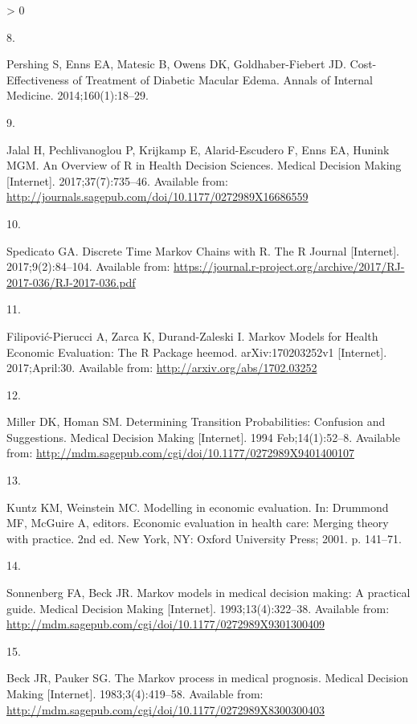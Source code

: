 \documentclass[
]{article}
\newlength{\cslhangindent}
\newlength{\csllabelwidth}
\newenvironment{CSLReferences}[2] %
 {%
  \setlength{\parindent}{0pt}
  \ifodd #1 \everypar{\setlength{\hangindent}{\cslhangindent}}\ignorespaces\fi
  \ifnum #2 > 0
  \setlength{\parskip}{#2\baselineskip}
  \fi
 }%
 {}
\newcommand{\CSLLeftMargin}[1]{\parbox[t]{\csllabelwidth}{#1}}
\newcommand{\CSLRightInline}[1]{\parbox[t]{\linewidth - \csllabelwidth}{#1}\break}
\begin{document}
\begin{CSLReferences}{0}{0}
\leavevmode\hypertarget{ref-Pershing2014}{}%
\CSLLeftMargin{8. }
\CSLRightInline{Pershing S, Enns EA, Matesic B, Owens DK, Goldhaber-Fiebert JD. {Cost-Effectiveness of Treatment of Diabetic Macular Edema}. Annals of Internal Medicine. 2014;160(1):18--29. }

\leavevmode\hypertarget{ref-Jalal2017b}{}%
\CSLLeftMargin{9. }
\CSLRightInline{Jalal H, Pechlivanoglou P, Krijkamp E, Alarid-Escudero F, Enns EA, Hunink MGM. {An Overview of R in Health Decision Sciences}. Medical Decision Making {[}Internet{]}. 2017;37(7):735--46. Available from: \url{http://journals.sagepub.com/doi/10.1177/0272989X16686559}}

\leavevmode\hypertarget{ref-Spedicato2017}{}%
\CSLLeftMargin{10. }
\CSLRightInline{Spedicato GA. {Discrete Time Markov Chains with R}. The R Journal {[}Internet{]}. 2017;9(2):84--104. Available from: \url{https://journal.r-project.org/archive/2017/RJ-2017-036/RJ-2017-036.pdf}}

\leavevmode\hypertarget{ref-Filipovic-Pierucci2017}{}%
\CSLLeftMargin{11. }
\CSLRightInline{Filipović-Pierucci A, Zarca K, Durand-Zaleski I. {Markov Models for Health Economic Evaluation: The R Package heemod}. arXiv:170203252v1 {[}Internet{]}. 2017;April:30. Available from: \url{http://arxiv.org/abs/1702.03252}}

\leavevmode\hypertarget{ref-Miller1994}{}%
\CSLLeftMargin{12. }
\CSLRightInline{Miller DK, Homan SM. {Determining Transition Probabilities: Confusion and Suggestions}. Medical Decision Making {[}Internet{]}. 1994 Feb;14(1):52--8. Available from: \url{http://mdm.sagepub.com/cgi/doi/10.1177/0272989X9401400107}}

\leavevmode\hypertarget{ref-Kuntz2001}{}%
\CSLLeftMargin{13. }
\CSLRightInline{Kuntz KM, Weinstein MC. {Modelling in economic evaluation}. In: Drummond MF, McGuire A, editors. Economic evaluation in health care: Merging theory with practice. 2nd ed. New York, NY: Oxford University Press; 2001. p. 141--71. }

\leavevmode\hypertarget{ref-Sonnenberg1993}{}%
\CSLLeftMargin{14. }
\CSLRightInline{Sonnenberg FA, Beck JR. {Markov models in medical decision making: A practical guide}. Medical Decision Making {[}Internet{]}. 1993;13(4):322--38. Available from: \url{http://mdm.sagepub.com/cgi/doi/10.1177/0272989X9301300409}}

\leavevmode\hypertarget{ref-Beck1983}{}%
\CSLLeftMargin{15. }
\CSLRightInline{Beck JR, Pauker SG. {The Markov process in medical prognosis}. Medical Decision Making {[}Internet{]}. 1983;3(4):419--58. Available from: \url{http://mdm.sagepub.com/cgi/doi/10.1177/0272989X8300300403}}


\end{CSLReferences}
\end{document}
